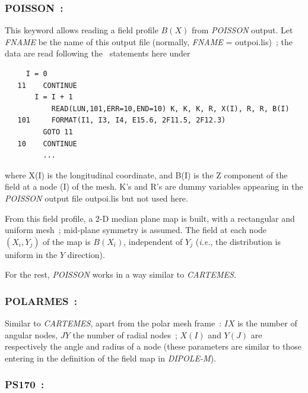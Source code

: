 \newpage

\subsubsection*{POISSON~:\POISSONTitl} \label{POISSON} 
\medskip 

This keyword allows reading a field profile $ B(X) $ from  \textsl{POISSON} output. 
Let \textsl{FNAME} be the name of this output file (normally,
\textsl{FNAME} = outpoi.lis)~; 
the data are read following the \FORTRAN\ statements here under 

{\footnotesize
\begin{verbatim}
	 I = 0
   11    CONTINUE
	   I = I + 1
           READ(LUN,101,ERR=10,END=10) K, K, K, R, X(I), R, R, B(I) 
   101     FORMAT(I1, I3, I4, E15.6, 2F11.5, 2F12.3)
         GOTO 11     
   10    CONTINUE
         ...
\end{verbatim}}
\medskip
 
\noindent where X(I) is the longitudinal coordinate, and B(I) is the Z
component of the field at a node (I) of the mesh. K's and R's are dummy variables 
appearing in the \textsl{POISSON} output file outpoi.lis
 but not used here. 
\medskip

\noindent From this field profile, a 2-D median plane map is built, with a 
rectangular and uniform mesh~; mid-plane symmetry is assumed. The field at 
each node $ (X_i,Y_j) $ of the map is $ B(X_i) $, independent of $ Y_j $
(\emph{i.e.}, the distribution is uniform in the $ Y $ direction).  
\medskip

\noindent For the rest, \textsl{POISSON} works in a way similar to \textsl{CARTEMES}. 

\newpage
\subsubsection*{POLARMES~: \POLARMESTitl} \label{POLARMES} 
\medskip 

Similar to \textsl{CARTEMES}, apart from the polar 
mesh frame~: $IX$ is the number of angular nodes, $JY$ the number of 
radial nodes~; $X(I)$ and $Y(J)$ are respectively the angle and radius 
of a node (these parameters are similar to those entering in the 
definition of the field map in \textsl{DIPOLE-M}).

\newpage

\subsubsection*{PS170~: \PSusoTitl} \label{PS170} 
\medskip 

